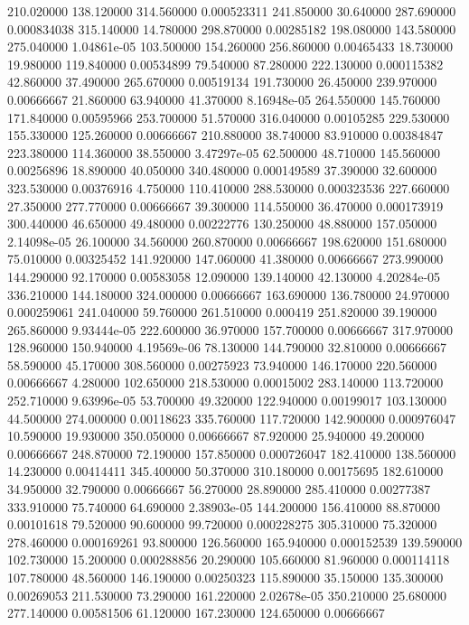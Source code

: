 210.020000	138.120000	314.560000	0.000523311
241.850000	30.640000	287.690000	0.000834038
315.140000	14.780000	298.870000	0.00285182
198.080000	143.580000	275.040000	1.04861e-05
103.500000	154.260000	256.860000	0.00465433
18.730000	19.980000	119.840000	0.00534899
79.540000	87.280000	222.130000	0.000115382
42.860000	37.490000	265.670000	0.00519134
191.730000	26.450000	239.970000	0.00666667
21.860000	63.940000	41.370000	8.16948e-05
264.550000	145.760000	171.840000	0.00595966
253.700000	51.570000	316.040000	0.00105285
229.530000	155.330000	125.260000	0.00666667
210.880000	38.740000	83.910000	0.00384847
223.380000	114.360000	38.550000	3.47297e-05
62.500000	48.710000	145.560000	0.00256896
18.890000	40.050000	340.480000	0.000149589
37.390000	32.600000	323.530000	0.00376916
4.750000	110.410000	288.530000	0.000323536
227.660000	27.350000	277.770000	0.00666667
39.300000	114.550000	36.470000	0.000173919
300.440000	46.650000	49.480000	0.00222776
130.250000	48.880000	157.050000	2.14098e-05
26.100000	34.560000	260.870000	0.00666667
198.620000	151.680000	75.010000	0.00325452
141.920000	147.060000	41.380000	0.00666667
273.990000	144.290000	92.170000	0.00583058
12.090000	139.140000	42.130000	4.20284e-05
336.210000	144.180000	324.000000	0.00666667
163.690000	136.780000	24.970000	0.000259061
241.040000	59.760000	261.510000	0.000419
251.820000	39.190000	265.860000	9.93444e-05
222.600000	36.970000	157.700000	0.00666667
317.970000	128.960000	150.940000	4.19569e-06
78.130000	144.790000	32.810000	0.00666667
58.590000	45.170000	308.560000	0.00275923
73.940000	146.170000	220.560000	0.00666667
4.280000	102.650000	218.530000	0.00015002
283.140000	113.720000	252.710000	9.63996e-05
53.700000	49.320000	122.940000	0.00199017
103.130000	44.500000	274.000000	0.00118623
335.760000	117.720000	142.900000	0.000976047
10.590000	19.930000	350.050000	0.00666667
87.920000	25.940000	49.200000	0.00666667
248.870000	72.190000	157.850000	0.000726047
182.410000	138.560000	14.230000	0.00414411
345.400000	50.370000	310.180000	0.00175695
182.610000	34.950000	32.790000	0.00666667
56.270000	28.890000	285.410000	0.00277387
333.910000	75.740000	64.690000	2.38903e-05
144.200000	156.410000	88.870000	0.00101618
79.520000	90.600000	99.720000	0.000228275
305.310000	75.320000	278.460000	0.000169261
93.800000	126.560000	165.940000	0.000152539
139.590000	102.730000	15.200000	0.000288856
20.290000	105.660000	81.960000	0.000114118
107.780000	48.560000	146.190000	0.00250323
115.890000	35.150000	135.300000	0.00269053
211.530000	73.290000	161.220000	2.02678e-05
350.210000	25.680000	277.140000	0.00581506
61.120000	167.230000	124.650000	0.00666667
